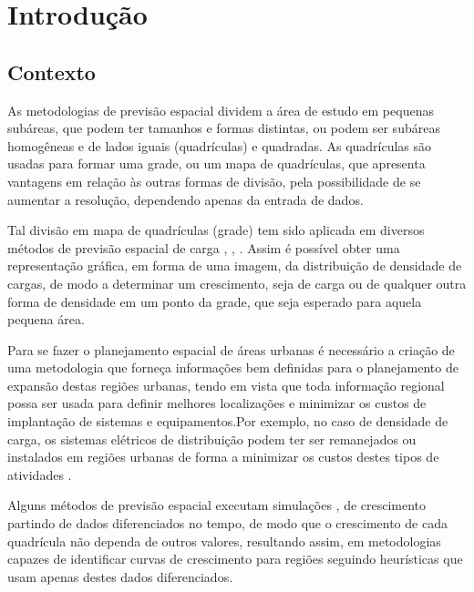 \chapter*[Introdução]{Introdução}
\label{introducao}


\section{Contexto}

As metodologias de previsão espacial dividem a área de estudo em pequenas subáreas, que podem ter tamanhos e formas distintas, ou podem ser subáreas homogêneas e de lados iguais (quadrículas) e quadradas. As quadrículas são usadas para formar uma grade, ou um mapa de quadrículas, que  apresenta vantagens em relação às outras formas de divisão, pela possibilidade de se aumentar a resolução, dependendo apenas da entrada de dados.

Tal  divisão em mapa de quadrículas (grade) tem sido aplicada em diversos métodos de previsão espacial de carga \cite{willis2002spatial}, \cite{melo2012multi}, \cite{arango2004spatial}. Assim é possível obter uma representação gráfica, em forma de uma imagem, da distribuição de densidade de cargas, de modo a determinar um crescimento, seja de carga ou de qualquer outra forma de densidade em um ponto da grade, que seja esperado para aquela pequena área. 

Para se fazer o planejamento espacial de áreas urbanas é necessário a criação de uma metodologia que forneça informações bem definidas para o planejamento de expansão destas regiões urbanas, tendo em vista que toda informação regional possa ser usada para definir melhores localizações e minimizar os custos de implantação de sistemas e equipamentos.Por exemplo, no caso de densidade de carga, os sistemas elétricos de distribuição podem ter ser remanejados ou instalados em regiões urbanas de forma a minimizar os custos destes tipos de atividades \cite{willis2007spatial}.    

Alguns métodos de previsão espacial executam simulações \cite{arango2004spatial}, \cite{carreno2011cellular} de crescimento partindo de dados diferenciados no tempo, de modo que o crescimento de cada quadrícula não dependa de outros valores, resultando assim, em metodologias capazes de identificar curvas de crescimento para regiões seguindo heurísticas que usam apenas destes dados diferenciados. 

